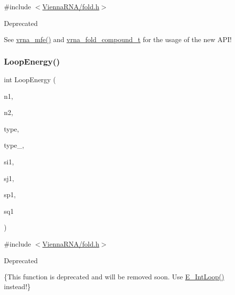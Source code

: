 {\ttfamily \#include $<$\mbox{\hyperlink{fold_8h}{Vienna\+R\+N\+A/fold.\+h}}$>$}

\begin{DoxyRefDesc}{Deprecated}
\item[\mbox{\hyperlink{deprecated__deprecated000079}{Deprecated}}]See \mbox{\hyperlink{group__mfe__fold_gabd3b147371ccf25c577f88bbbaf159fd}{vrna\+\_\+mfe()}} and \mbox{\hyperlink{group__fold__compound_ga1b0cef17fd40466cef5968eaeeff6166}{vrna\+\_\+fold\+\_\+compound\+\_\+t}} for the usage of the new A\+P\+I!\end{DoxyRefDesc}
\mbox{\label{group__mfe__fold__single_ga2163034a25c6115d894b199e97e03f6c}} 
\subsubsection{\texorpdfstring{Loop\+Energy()}{LoopEnergy()}}
{\footnotesize\ttfamily int Loop\+Energy (\begin{DoxyParamCaption}\item[{int}]{n1,  }\item[{int}]{n2,  }\item[{int}]{type,  }\item[{int}]{type\+\_,  }\item[{int}]{si1,  }\item[{int}]{sj1,  }\item[{int}]{sp1,  }\item[{int}]{sq1 }\end{DoxyParamCaption})}



{\ttfamily \#include $<$\mbox{\hyperlink{fold_8h}{Vienna\+R\+N\+A/fold.\+h}}$>$}

\begin{DoxyRefDesc}{Deprecated}
\item[\mbox{\hyperlink{deprecated__deprecated000080}{Deprecated}}]\{This function is deprecated and will be removed soon. Use \mbox{\hyperlink{group__loops_gaafbc187b7f78e8e82afb77dd6f3b8fc5}{E\+\_\+\+Int\+Loop()}} instead!\} \end{DoxyRefDesc}
\mbox{\label{group__mfe__fold__single_gab327ce11972f5ac069d52c8dedfdb700}} 
